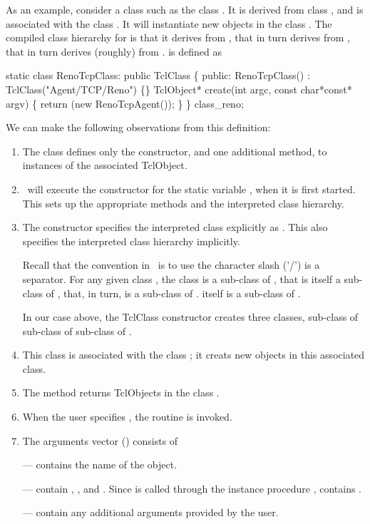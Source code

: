 As an example, consider a class such as the
class .
It is derived from class , and
is associated with the class .
It will instantiate new objects in the class .
The compiled class hierarchy for  is that
it derives from , that in turn derives from ,
that in turn derives (roughly) from .
 is defined as
\begin{program}
        static class RenoTcpClass: public TclClass \{
        public:
                RenoTcpClass() : TclClass("Agent/TCP/Reno") \{\}
                TclObject* create(int argc, const char*const* argv) \{
                        return (new RenoTcpAgent());
                \}
        \} class_reno;
\end{program}
We can make the following observations from this definition:
\begin{enumerate}
\item The class defines only the constructor, and one additional method,
  to  instances of the associated TclObject.
\item \ns\ will execute the  constructor
  for the static variable , when it is first started.
  This sets up the appropriate methods and the interpreted class hierarchy.
\item The constructor specifies the interpreted class explicitly as
  .  This also specifies the interpreted class
  hierarchy implicitly.

  Recall that the convention in \ns\ is to use
  the character slash ('/') is a separator.
  For any given class ,
  the class  is a sub-class of ,
  that is itself a sub-class of ,
  that, in turn, is a sub-class of .
   itself is a sub-class of .

  In our case above, the TclClass constructor creates three classes,
   sub-class of 
  sub-class of  sub-class of .
\item This class is associated with the class ;
  it creats new objects in this associated class.
\item The  method returns TclObjects in the
  class .
\item When the user specifies ,
  the routine  is invoked.
\item The arguments vector () consists of

  ---  contains the name of the object.

  ---  contain
  , , and .
  Since  is called
  through the instance procedure ,
   contains .

  --- 
  contain any additional arguments provided by the user.
\end{enumerate}
